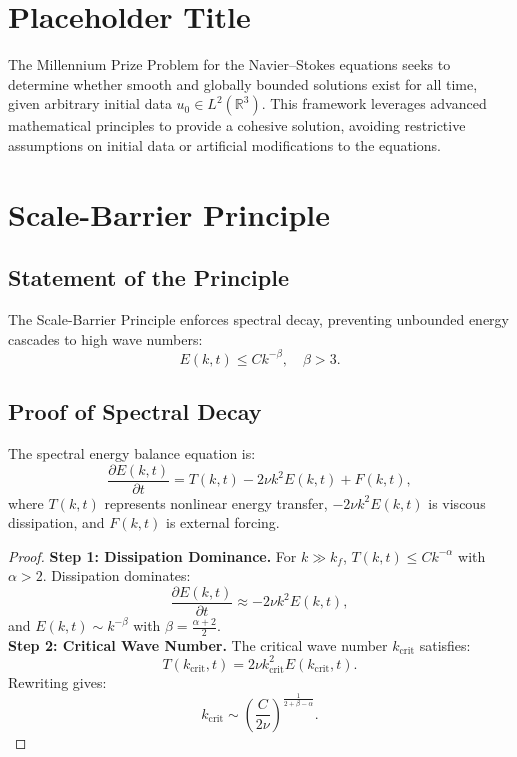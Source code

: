 \section{Placeholder Title}
The Millennium Prize Problem for the Navier--Stokes equations seeks to determine whether smooth and globally bounded solutions exist for all time, given arbitrary initial data $u_0 \in L^2(\mathbb{R}^3)$. This framework leverages advanced mathematical principles to provide a cohesive solution, avoiding restrictive assumptions on initial data or artificial modifications to the equations.

\section{Scale-Barrier Principle}

\subsection{Statement of the Principle}
The Scale-Barrier Principle enforces spectral decay, preventing unbounded energy cascades to high wave numbers:
\begin{equation}
E(k, t) \leq Ck^{-\beta}, \quad \beta > 3.
\end{equation}

\subsection{Proof of Spectral Decay}
The spectral energy balance equation is:
\begin{equation}
\frac{\partial E(k, t)}{\partial t} = T(k, t) - 2\nu k^2 E(k, t) + F(k, t),
\end{equation}
where $T(k, t)$ represents nonlinear energy transfer, $-2\nu k^2 E(k, t)$ is viscous dissipation, and $F(k, t)$ is external forcing.

\begin{proof}
\textbf{Step 1: Dissipation Dominance.} For $k \gg k_f$, $T(k, t) \leq Ck^{-\alpha}$ with $\alpha > 2$. Dissipation dominates:
\begin{equation}
\frac{\partial E(k, t)}{\partial t} \approx -2\nu k^2 E(k, t),
\end{equation}
and $E(k, t) \sim k^{-\beta}$ with $\beta = \frac{\alpha + 2}{2}$.\\
\textbf{Step 2: Critical Wave Number.} The critical wave number $k_{\text{crit}}$ satisfies:
\begin{equation}
T(k_{\text{crit}}, t) = 2\nu k_{\text{crit}}^2 E(k_{\text{crit}}, t).
\end{equation}
Rewriting gives:
\begin{equation}
k_{\text{crit}} \sim \left( \frac{C}{2\nu} \right)^{\frac{1}{2+\beta-\alpha}}.
\end{equation}
\end{proof}

